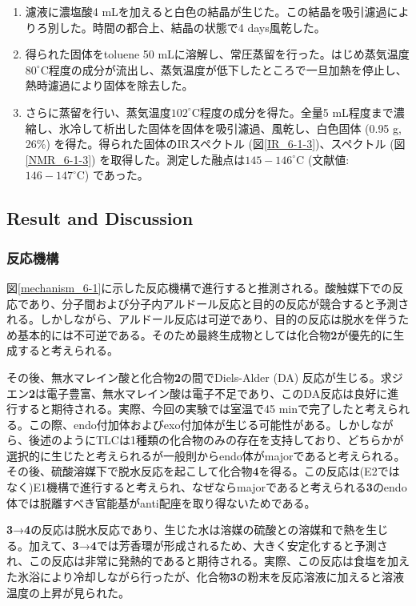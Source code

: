 \documentclass{ltjsarticle}
\theoremstyle{definition}
\numberwithin{equation}{section}
\newcommand{\D}{^\circ\text{C}}
\begin{document}
\begin{enumerate}
\item 濾液に濃塩酸4 mLを加えると白色の結晶が生じた。この結晶を吸引濾過によりろ別した。時間の都合上、結晶の状態で4 days風乾した。
\item 得られた固体をtoluene 50 mLに溶解し、常圧蒸留を行った。はじめ蒸気温度$80\D$程度の成分が流出し、蒸気温度が低下したところで一旦加熱を停止し、熱時濾過により固体を除去した。
\item さらに蒸留を行い、蒸気温度$102\D$程度の成分を得た。全量5 mL程度まで濃縮し、氷冷して析出した固体を固体を吸引濾過、風乾し、白色固体 (0.95 g, 26\%) を得た。得られた固体のIRスペクトル (図\ref{IR_6-1-3})、スペクトル (図\ref{NMR_6-1-3}) を取得した。測定した融点は$145-146\D$ (文献値: $146-147\D$) であった。
\end{enumerate}

\subsection{Result and Discussion}
\subsubsection{反応機構}

図\ref{mechanism_6-1}に示した反応機構で進行すると推測される。酸触媒下での反応であり、分子間および分子内アルドール反応と目的の反応が競合すると予測される。しかしながら、アルドール反応は可逆であり、目的の反応は脱水を伴うため基本的には不可逆である。そのため最終生成物としては化合物\textbf{2}が優先的に生成すると考えられる。

その後、無水マレイン酸と化合物\textbf{2}の間でDiels-Alder (DA) 反応が生じる。求ジエン\textbf{2}は電子豊富、無水マレイン酸は電子不足であり、このDA反応は良好に進行すると期待される。実際、今回の実験では室温で45 minで完了したと考えられる。この際、endo付加体およびexo付加体が生じる可能性がある。しかしながら、後述のようにTLCは1種類の化合物のみの存在を支持しており、どちらかが選択的に生じたと考えられるが一般則からendo体がmajorであると考えられる。
その後、硫酸溶媒下で脱水反応を起こして化合物\textbf{4}を得る。この反応は(E2ではなく)E1機構で進行すると考えられ、なぜならmajorであると考えられる\textbf{3}のendo体では脱離すべき官能基がanti配座を取り得ないためである。

\textbf{3}→\textbf{4}の反応は脱水反応であり、生じた水は溶媒の硫酸との溶媒和で熱を生じる。加えて、\textbf{3}→\textbf{4}では芳香環が形成されるため、大きく安定化すると予測され、この反応は非常に発熱的であると期待される。実際、この反応は食塩を加えた氷浴により冷却しながら行ったが、化合物\textbf{3}の粉末を反応溶液に加えると溶液温度の上昇が見られた。
\end{document}
